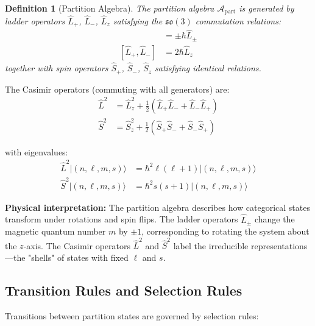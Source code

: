 \documentclass[twocolumn,10pt]{article}
\newtheorem{definition}[theorem]{Definition}
\theoremstyle{remark}
\begin{document}
\begin{definition}[Partition Algebra]
\label{def:partition_algebra}
The partition algebra $\mathcal{A}_{\text{part}}$ is generated by ladder operators $\hat{L}_+$, $\hat{L}_-$, $\hat{L}_z$ satisfying the $\mathfrak{so}(3)$ commutation relations:
\begin{align}
    [\hat{L}_z, \hat{L}_{\pm}] &= \pm \hbar \hat{L}_{\pm} \label{eq:commutator_Lz_Lpm} \\
    [\hat{L}_+, \hat{L}_-] &= 2\hbar \hat{L}_z \label{eq:commutator_Lp_Lm}
\end{align}
together with spin operators $\hat{S}_+$, $\hat{S}_-$, $\hat{S}_z$ satisfying identical relations.
\end{definition}

The Casimir operators (commuting with all generators) are:
\begin{align}
    \hat{L}^2 &= \hat{L}_z^2 + \frac{1}{2}(\hat{L}_+ \hat{L}_- + \hat{L}_- \hat{L}_+) \label{eq:casimir_L} \\
    \hat{S}^2 &= \hat{S}_z^2 + \frac{1}{2}(\hat{S}_+ \hat{S}_- + \hat{S}_- \hat{S}_+) \label{eq:casimir_S}
\end{align}

with eigenvalues:
\begin{align}
    \hat{L}^2 |(n, \ell, m, s)\rangle &= \hbar^2 \ell(\ell+1) |(n, \ell, m, s)\rangle \label{eq:L2_eigenvalue} \\
    \hat{S}^2 |(n, \ell, m, s)\rangle &= \hbar^2 s(s+1) |(n, \ell, m, s)\rangle \label{eq:S2_eigenvalue}
\end{align}

\textbf{Physical interpretation:} The partition algebra describes how categorical states transform under rotations and spin flips. The ladder operators $\hat{L}_{\pm}$ change the magnetic quantum number $m$ by $\pm 1$, corresponding to rotating the system about the $z$-axis. The Casimir operators $\hat{L}^2$ and $\hat{S}^2$ label the irreducible representations—the "shells" of states with fixed $\ell$ and $s$.

\subsection{Transition Rules and Selection Rules}

Transitions between partition states are governed by selection rules:
\end{document}
